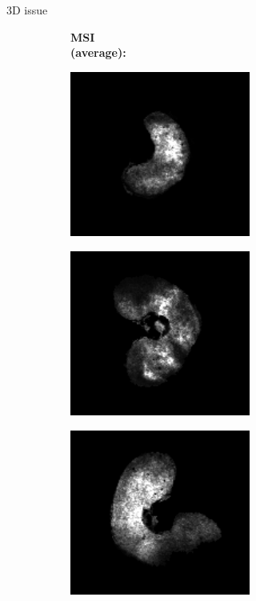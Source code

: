 \documentclass[10pt]{beamer}
\begin{document}
\begin{frame}{3D issue}
\begin{figure}[ht]
\begin{subfigure}[b]{0.15\textwidth}
       \textbf{MSI \\ (average):}%
     \end{subfigure}%
     \begin{subfigure}[c]{0.3\textwidth}
       \centering
       \includegraphics[width=0.65\textwidth]{fig/3D_segmentation0000}%
     \end{subfigure}%
     \begin{subfigure}[c]{0.3\textwidth}
       \centering
       \includegraphics[width=0.65\textwidth]{fig/3D_segmentation0003}%
     \end{subfigure}%
     \begin{subfigure}[c]{0.3\textwidth}
       \centering
       \includegraphics[width=0.65\textwidth]{fig/3D_segmentation0006}%
     \end{subfigure}
     

\end{figure}
\end{frame}
\end{document}
